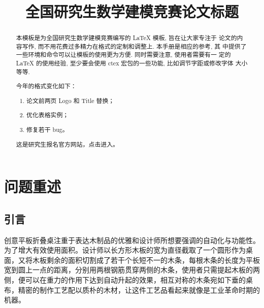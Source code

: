 \documentclass[bwprint,fontset=windows]{gmcmthesis}
\title{全国研究生数学建模竞赛论文标题}
\begin{document}
 \maketitle

\begin{abstract}
本模板是为全国研究生数学建模竞赛编写的 \LaTeX{} 模板, 旨在让大家专注于
论文的内容写作, 而不用花费过多精力在格式的定制和调整上. 本手册是相应的参考, 其
中提供了一些环境和命令可以让模板的使用更为方便. 同时需要注意, 使用者需要有一
定的 \LaTeX{} 的使用经验, 至少要会使用 ctex 宏包的一些功能, 比如调节字距或修改字体
大小等等.

\begin{mdframed}[%
roundcorner=5pt,linecolor=gray!50,outerlinewidth=0.5pt,
middlelinewidth=0.3pt,backgroundcolor=gray!2,
innertopmargin=\topskip, frametitle={2024年格式变化说明},
frametitlefont= \bfseries,frametitlerule=true,frametitlealignment =\raggedright\noindent,
frametitlerulewidth=.5pt, frametitlebackgroundcolor=gray!2,]
今年的格式变化如下：
\begin{enumerate}
\item 论文前两页 Logo 和 Title 替换；
\item 优化表格实例；
\item 修复若干 bug。
\end{enumerate}
\end{mdframed}

这是研究生报名官方网站，点击\href{https://cpipc.chinadegrees.cn}{}进入。



\end{abstract}

\pagestyle{plain}

\maketoc

\clearpage

\section{问题重述}

\subsection{引言}   %

创意平板折叠桌注重于表达木制品的优雅和设计师所想要强调的自动化与功能性。为了增大有效使用面积。设计师以长方形木板的宽为直径截取了一个圆形作为桌面，又将木板剩余的面积切割成了若干个长短不一的木条，每根木条的长度为平板宽到圆上一点的距离，分别用两根钢筋贯穿两侧的木条，使用者只需提起木板的两侧，便可以在重力的作用下达到自动升起的效果，相互对称的木条宛如下垂的桌布，精密的制作工艺配以质朴的木材，让这件工艺品看起来就像是工业革命时期的机器。
\end{document}
